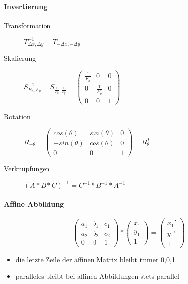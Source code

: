 \documentclass[10pt,landscape]{article}
\begin{document}
\begin{multicols}{3}
  \paragraph*{Invertierung}
  \begin{description}
    \item[Transformation]  $T_{\Delta x, \Delta y}^{-1} = T_{-\Delta x, -\Delta y}$
    \item[Skalierung] $S_{F_x, F_y}^{-1}=S_{\frac{1}{F_x},\frac{1}{F_y}}=\begin{pmatrix} \frac{1}{F_x} &0&0\\ 0&\frac{1}{F_y}&0\\ 0&0&1 \end{pmatrix}$
    \item[Rotation] $R_{-\theta} = \begin{pmatrix} cos(\theta) & sin(\theta) & 0 \\ -sin(\theta) & cos(\theta) & 0 \\ 0 & 0 & 1 \end{pmatrix} = R_{\theta}^{T}$
    \item[Verknüpfungen] $(A*B*C)^{-1}=C^{-1}*B^{-1}*A^{-1}$
  \end{description}
  
  \paragraph{Affine Abbildung}
  $$\begin{pmatrix}a_1 & b_1 & c_1\\a_2 &b_2 & c_2\\ 0&0&1\end{pmatrix}*\begin{pmatrix} x_1\\y_1\\1\end{pmatrix}= \begin{pmatrix}x_1'\\y_1'\\1 \end{pmatrix}$$
  \begin{itemize}
    \item die letzte Zeile der affinen Matrix bleibt immer 0,0,1
    \item paralleles bleibt bei affinen Abbildungen stets parallel
  \end{itemize}
  

\end{multicols}
\end{document}
